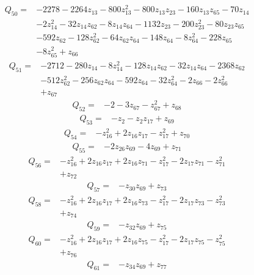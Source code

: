 \[\begin{aligned}Q_{50}={}&-2278-2264z_{13}-800z_{13}^{2}-800z_{13}z_{23}-160z_{13}z_{65}-70z_{14}
\\&-2z_{14}^{2}-32z_{14}z_{62}-8z_{14}z_{64}-1132z_{23}-200z_{23}^{2}-80z_{23}z_{65}
\\&-592z_{62}-128z_{62}^{2}-64z_{62}z_{64}-148z_{64}-8z_{64}^{2}-228z_{65}
\\&-8z_{65}^{2}+z_{66}
\end{aligned}\]
\[\begin{aligned}Q_{51}={}&-2712-280z_{14}-8z_{14}^{2}-128z_{14}z_{62}-32z_{14}z_{64}-2368z_{62}
\\&-512z_{62}^{2}-256z_{62}z_{64}-592z_{64}-32z_{64}^{2}-2z_{66}-2z_{66}^{2}
\\&+z_{67}
\end{aligned}\]
\[\begin{aligned}Q_{52}={}&-2-3z_{67}-z_{67}^{2}+z_{68}
\end{aligned}\]
\[\begin{aligned}Q_{53}={}&-z_{2}-z_{2}z_{17}+z_{69}
\end{aligned}\]
\[\begin{aligned}Q_{54}={}&-z_{16}^{2}+2z_{16}z_{17}-z_{17}^{2}+z_{70}
\end{aligned}\]
\[\begin{aligned}Q_{55}={}&-2z_{26}z_{69}-4z_{69}+z_{71}
\end{aligned}\]
\[\begin{aligned}Q_{56}={}&-z_{16}^{2}+2z_{16}z_{17}+2z_{16}z_{71}-z_{17}^{2}-2z_{17}z_{71}-z_{71}^{2}
\\&+z_{72}
\end{aligned}\]
\[\begin{aligned}Q_{57}={}&-z_{30}z_{69}+z_{73}
\end{aligned}\]
\[\begin{aligned}Q_{58}={}&-z_{16}^{2}+2z_{16}z_{17}+2z_{16}z_{73}-z_{17}^{2}-2z_{17}z_{73}-z_{73}^{2}
\\&+z_{74}
\end{aligned}\]
\[\begin{aligned}Q_{59}={}&-z_{32}z_{69}+z_{75}
\end{aligned}\]
\[\begin{aligned}Q_{60}={}&-z_{16}^{2}+2z_{16}z_{17}+2z_{16}z_{75}-z_{17}^{2}-2z_{17}z_{75}-z_{75}^{2}
\\&+z_{76}
\end{aligned}\]
\[\begin{aligned}Q_{61}={}&-z_{34}z_{69}+z_{77}
\end{aligned}\]
